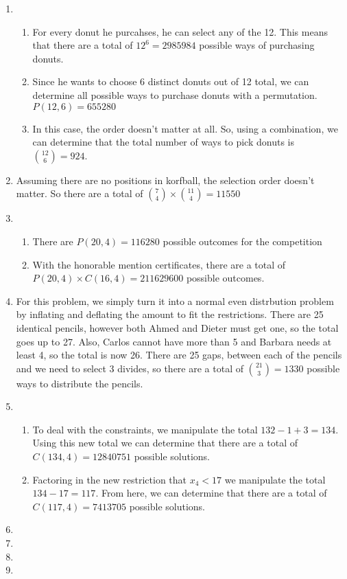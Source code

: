 \documentclass[12pt]{article}
\newcommand{\s}[1]{\setcounter{enumi}{#1}}
\begin{document}
\begin{enumerate}
  \item 
    \begin{enumerate}
      \item For every donut he purcahses, he can select any of the 12. This means that there are a total of $12^6 = 2985984$ possible ways of purchasing donuts.
      \item Since he wants to choose 6 distinct donuts out of 12 total, we can determine all possible ways to purchase donuts with a permutation. $P(12, 6) = 655280$
      \item In this case, the order doesn't matter at all. So, using a combination, we can determine that the total number of ways to pick donuts is $\binom{12}{6} = 924$.
    \end{enumerate}
  \item Assuming there are no positions in korfball, the selection order doesn't matter. So there are a total of $\binom{7}{4} \times \binom{11}{4} = 11550$
  \item
    \begin{enumerate}
      \item There are $P(20,4) = 116280$ possible outcomes for the competition
      \item With the honorable mention certificates, there are a total of $P(20,4) \times C(16,4) = 211629600$ possible outcomes.
    \end{enumerate}

  \s{14}
  
  \item For this problem, we simply turn it into a normal even distrbution problem by inflating and deflating the amount to fit the restrictions. There are 25 identical pencils, however both Ahmed and Dieter must get one, so the total goes up to 27. Also, Carlos cannot have more than 5 and Barbara needs at least 4, so the total is now 26. There are 25 gaps, between each of the pencils and we need to select 3 divides, so there are a total of $\binom{21}{3} = 1330$ possible ways to distribute the pencils.

  \s{16}

  \item 
    \begin{enumerate}
      \item To deal with the constraints, we manipulate the total $132 - 1 + 3 = 134$. Using this new total we can determine that there are a total of $C(134, 4) = 12840751$ possible solutions.
      \item Factoring in the new restriction that $x_4 < 17$ we manipulate the total $134 - 17 = 117$. From here, we can determine that there are a total of $C(117, 4) = 7413705$ possible solutions.
    \end{enumerate}

  \s{19}

  \item 

  \s{23}

  \item

  \s{25}

  \item

  \s{27}

  \item

\end{enumerate}
\end{document}

